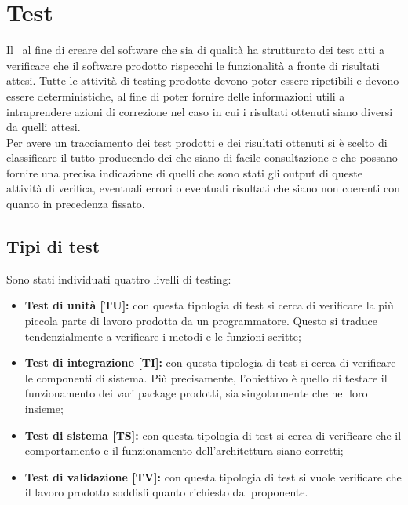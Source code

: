 \section{Test}
Il  \gruppo\ al fine di creare del software che sia di qualità ha strutturato dei test atti a verificare
che il software prodotto rispecchi le funzionalità a fronte di risultati attesi.
Tutte le attività di testing prodotte devono poter essere ripetibili e devono essere deterministiche, al fine di poter
fornire delle informazioni utili a intraprendere azioni di correzione nel caso in cui i risultati ottenuti siano diversi da quelli attesi. \\
Per avere un tracciamento dei test prodotti e dei risultati ottenuti si è scelto di classificare il tutto producendo dei
 che siano di facile consultazione e che possano fornire una precisa indicazione di quelli che sono stati
gli output di queste attività di verifica, eventuali errori o eventuali risultati che siano non coerenti con quanto in precedenza fissato.

\subsection{Tipi di test}
Sono stati individuati quattro livelli di testing:
\begin{itemize}
\item \textbf{Test di unità [TU]:} con questa tipologia di test si cerca di verificare la più piccola parte di lavoro prodotta da un programmatore. Questo si traduce tendenzialmente a verificare i metodi e le funzioni scritte;
\item \textbf{Test di integrazione [TI]:} con questa tipologia di test si cerca di verificare le componenti di sistema. Più precisamente, l'obiettivo è quello di testare il funzionamento dei vari package prodotti, sia singolarmente che nel loro insieme;
\item \textbf{Test di sistema [TS]:} con questa tipologia di test si cerca di verificare che il comportamento e il funzionamento dell'architettura siano corretti;
\item \textbf{Test di validazione [TV]:} con questa tipologia di test si vuole verificare che il lavoro prodotto soddisfi quanto richiesto dal proponente.
\end{itemize}





\newpage